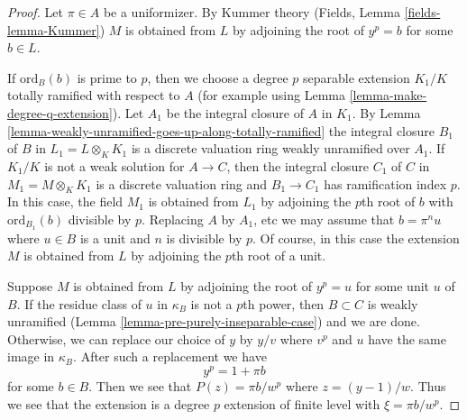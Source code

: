 \documentclass[10pt,a4paper]{amsart}
\theoremstyle{plain}
\theoremstyle{definition}
\theoremstyle{remark}
\numberwithin{equation}{subsection}
\begin{document}
\begin{proof}
Let $\pi \in A$ be a uniformizer. By Kummer theory
(Fields, Lemma \ref{fields-lemma-Kummer}) $M$ is obtained
from $L$ by adjoining the root of $y^p = b$ for some $b \in L$.

\medskip\noindent
If $\text{ord}_B(b)$ is prime to $p$, then we choose a degree $p$
separable extension $K_1/K$
totally ramified with respect to $A$ (for example
using Lemma \ref{lemma-make-degree-q-extension}).
Let $A_1$ be the integral closure of $A$ in $K_1$.
By Lemma \ref{lemma-weakly-unramified-goes-up-along-totally-ramified}
the integral closure $B_1$ of $B$ in $L_1 = L \otimes_K K_1$
is a discrete valuation ring weakly unramified over $A_1$.
If $K_1/K$ is not a weak solution for $A \to C$, then
the integral closure $C_1$ of $C$ in $M_1 = M \otimes_K K_1$ is a
discrete valuation ring and $B_1 \to C_1$ has ramification index $p$.
In this case, the field $M_1$ is obtained from $L_1$ by adjoining the
$p$th root of $b$ with $\text{ord}_{B_1}(b)$ divisible by $p$.
Replacing $A$ by $A_1$, etc we may assume that $b = \pi^n u$ where
$u \in B$ is a unit and $n$ is divisible by $p$. Of course, in
this case the extension $M$ is obtained from $L$ by adjoining
the $p$th root of a unit.

\medskip\noindent
Suppose $M$ is obtained from $L$ by adjoining the root of
$y^p = u$ for some unit $u$ of $B$. If the residue class of $u$
in $\kappa_B$ is not a $p$th power, then $B \subset C$ is
weakly unramified (Lemma \ref{lemma-pre-purely-inseparable-case})
and we are done. Otherwise, we can replace our choice of $y$ by
$y/v$ where $v^p$ and $u$ have the same image in $\kappa_B$.
After such a replacement we have
$$
y^p = 1 + \pi b
$$
for some $b \in B$. Then we see that $P(z) = \pi b/ w^p$ where
$z = (y - 1)/w$. Thus we see that the extension is a degree $p$
extension of finite level with $\xi = \pi b / w^p$.
\end{proof}
\end{document}
